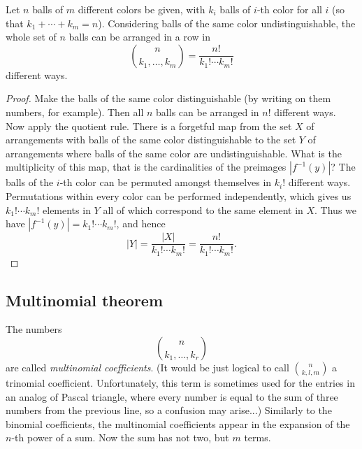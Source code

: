 \begin{page}
\setcounter{section}{4}
\setcounter{subsection}{1}
\setcounter{dfn}{1}
\label{portion:113}

\begin{thm}
Let $n$ balls of $m$ different colors be given, with $k_i$ balls of $i$-th color for all $i$ (so that $k_1 + \cdots + k_m = n$).
Considering balls of the same color undistinguishable, the whole set of $n$ balls can be arranged in a row in
\[
\binom{n}{k_1, \ldots, k_m} = \frac{n!}{k_1! \cdots k_m!}
\]
different ways.
\end{thm}

\end{page}

\begin{page}
\setcounter{section}{4}
\setcounter{subsection}{2}
\setcounter{dfn}{1}
\label{portion:114}

\begin{proof}
Make the balls of the same color distinguishable (by writing on them numbers, for example).
Then all $n$ balls can be arranged in $n!$ different ways.
Now apply the quotient rule.
There is a forgetful map from the set $X$ of arrangements with balls of the same color distinguishable
to the set $Y$ of arrangements where balls of the same color are undistinguishable.
What is the multiplicity of this map, that is the cardinalities of the preimages $|f^{-1}(y)|$?
The balls of the $i$-th color can be permuted amongst themselves in $k_i!$ different ways.
Permutations within every color can be performed independently, which gives us $k_1! \cdots k_m!$ elements in $Y$
all of which correspond to the same element in $X$.
Thus we have $|f^{-1}(y)| = k_1! \cdots k_m!$, and hence
\[
|Y| = \frac{|X|}{k_1! \cdots k_m!} = \frac{n!}{k_1! \cdots k_m!}.
\]
\end{proof}




\end{page}

\begin{page}
\setcounter{section}{4}
\setcounter{subsection}{2}
\setcounter{dfn}{1}
\label{portion:115}

\subsection{Multinomial theorem}
The numbers
\[
\binom{n}{k_1, \ldots, k_r}
\]
are called \emph{multinomial coefficients}.
(It would be just logical to call $\binom{n}{k, l, m}$ a trinomial coefficient.
Unfortunately, this term is sometimes used for the entries in an analog of Pascal triangle,
where every number is equal to the sum of three numbers from the previous line, so a confusion may arise...)
Similarly to the binomial coefficients, the multinomial coefficients appear in the expansion of the $n$-th power of a sum.
Now the sum has not two, but $m$ terms.


\end{page}


